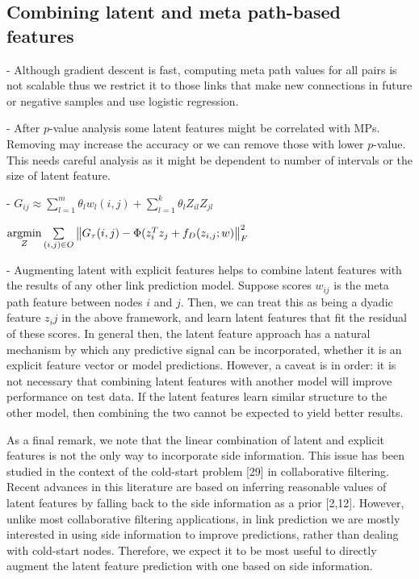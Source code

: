 \subsection{Combining latent and meta path-based features}


- Although gradient descent is fast, computing meta path values for all pairs is not scalable thus we restrict it to those links that make new connections in future or negative samples and use logistic regression. 

- After $p$-value analysis some latent features might be correlated with MPs. Removing may increase the accuracy or we can remove those with lower $p$-value. This needs careful analysis as it might be dependent to number of intervals or the size of latent feature.

- $G_{ij} \approx  \sum_{l=1}^{m} \theta_l w_l(i,j) + \sum_{l=1}^{k} \theta_l Z_{il}Z_{jl}$

$ \operatorname*{argmin}\limits_{Z} \sum\limits_{(i,j)\in O} \left \| G_\tau(i,j) - \Phi(z_{i}^Tz_{j} + f_D(z_{i,j};w) \right \|^2_F $


- Augmenting latent with explicit features helps to combine latent features with the results of any other link prediction model. Suppose scores $w_{ij}$ is the meta path feature between nodes $i$ and $j$. Then, we can treat this as being a dyadic feature $z_ij$ in the above framework, and learn latent features that fit the residual of these scores. In general then, the latent feature approach has a natural mechanism by which any predictive signal can be incorporated, whether it is an explicit feature vector or model predictions. However, a caveat is in order: it is not necessary that combining latent features with another model will improve performance on test data. If the latent features learn similar structure to the other model, then combining the two cannot be expected to yield better results.

As a final remark, we note that the linear combination of latent and explicit features is not the only way to incorporate side information. This issue has been studied in the context of the cold-start problem [29] in collaborative filtering. Recent advances in this literature are based on inferring reasonable values of latent features by falling back to the side information as a prior [2,12]. However, unlike most collaborative filtering applications, in link prediction we are mostly interested in using side information to improve predictions, rather than dealing with cold-start nodes. Therefore, we expect it to be most useful to directly augment the latent feature prediction with one based on side information.


